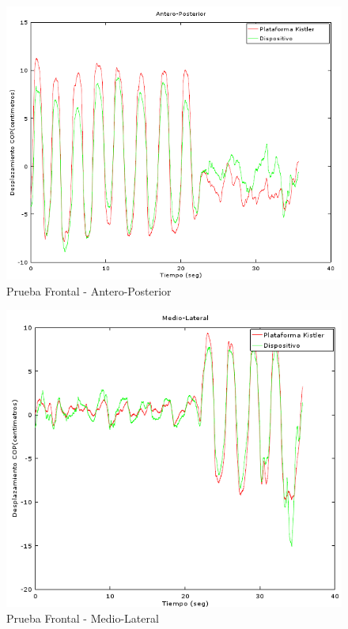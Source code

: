 \documentclass[12pt,a4paper]{article}
\begin{document}
	\begin{figure}[H]
		\centering
		\centering
		\includegraphics[width=1\linewidth]{images/pruebas/Frontal/Antero-Posterior}
		\caption{Prueba Frontal - Antero-Posterior}
		\label{fig:anteroPosterioFrontal}
	\end{figure}
	\begin{figure}[H]
		\centering
		\includegraphics[width=1\linewidth]{images/pruebas/Frontal/Medio-Lateral}
		\caption{Prueba Frontal - Medio-Lateral}
		\label{fig:medioLateralFrontal}
	\end{figure}
	
\end{document}
